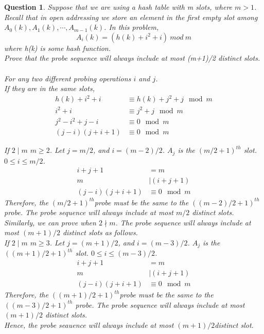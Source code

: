 \documentclass[10.5pt]{article}
\newtheorem{Q}{Question}
\begin{document}
\begin{Q}
Suppose that we are using a hash table with m slots, where $m>1$. Recall that in open addressing we store an element in the first empty slot among $A_0(k),A_1(k),\cdots,A_{m-1}(k)$. In this problem,
$$A_i(k)=(h(k)+i^2+i)~mod~m$$
where h(k) is some hash function.\\
Prove that the probe sequence will always include at most (m+1)/2 distinct slots.\\
\\
\textup{For any two different probing operations }$i$\textup{ and }$j$\textup{.}\\\textup{If they are in the same slots, }
\begin{align*}
h(k) + i^2 + i &\equiv h(k) + j^2 + j \mod m\\
i^2 + i &\equiv j^2 + j \mod m\\
j^2 - i^2 + j - i &\equiv 0 \mod m\\
(j-i)(j+i+1) &\equiv 0 \mod m
\end{align*}

\textup{If }$2\mid m$\text{, } $m \ge 2$\textup{.}
\textup{Let }$j = m/2$\textup{, and }$i = (m-2)/2$\textup{. }$A_j$\textup{ is the }$(m/2 + 1)^{th}$\textup{ slot. }$0\le i\le m/2$\textup{.}
\begin{align*}
i+j+1 &= m\\
m&\mid(i+j+1)\\
(j-i)(j+i+1)&\equiv 0 \mod m	
\end{align*}
\textup{Therefore, the }$(m/2 + 1)^{th}$\textup{probe must be the same to the }$((m - 2)/2+1)^{th}$\textup{ probe. The probe sequence will always include at most }$m/2$\textup{ distinct slots.}\\
\textup{Similarly, we can prove when }$2\nmid m$\textup{. The probe sequence will always include at most $(m + 1)/2$ distinct slots as follows.}\\
\textup{If }$2\mid m$\text{, } $m \ge 3$\textup{.}
\textup{Let }$j = (m + 1)/2$\textup{, and }$i = (m-3)/2$\textup{. }$A_j$\textup{ is the }$((m + 1)/2 + 1)^{th}$\textup{ slot. }$0\le i\le (m - 3)/2$\textup{.}
\begin{align*}
i+j+1 &= m\\
m&\mid(i+j+1)\\
(j-i)(j+i+1)&\equiv 0 \mod m	
\end{align*}
\textup{Therefore, the }$((m + 1)/2 + 1)^{th}$\textup{probe must be the same to the }$((m - 3)/2+1)^{th}$\textup{ probe. The probe sequence will always include at most }$(m+1)/2$\textup{ distinct slots.}\\
\textup{Hence, the probe seauence will always include at most $(m+1)/2$distinct slot.}

\end{Q}
\end{document}
